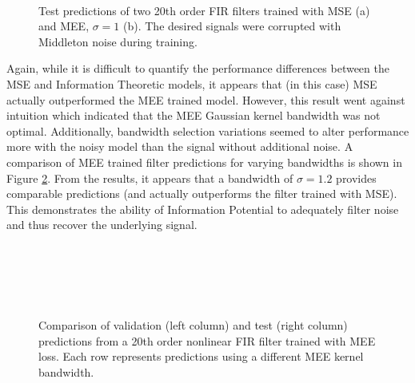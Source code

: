 \documentclass{article}[12 pt]
\begin{document}
\begin{figure}[H]
	\centering
	\quad
	\\
	\caption{Test predictions of two 20th order FIR filters trained with MSE (a) and MEE, $\sigma=1$ (b).  The desired signals were corrupted with Middleton noise during training.}
	\label{fig:test_with_noise}
\end{figure}

Again, while it is difficult to quantify the performance differences between the MSE and Information Theoretic models, it appears that (in this case) MSE actually outperformed the MEE trained model.  However, this result went against intuition which indicated that the MEE Gaussian kernel bandwidth was not optimal. Additionally, bandwidth selection variations seemed to alter performance more with the noisy model than the signal without additional noise. A comparison of  MEE trained filter predictions for varying bandwidths is shown in Figure \ref{fig:mee_bandwidth_comparison}.  From the results, it appears that a bandwidth of $\sigma=1.2$ provides comparable predictions (and actually outperforms the filter trained with MSE).  This demonstrates the ability of Information Potential to adequately filter noise and thus recover the underlying signal.

\begin{figure}[H]
	\centering
	\quad
	\\
	\quad
	\\
	\quad
	\\
	\quad
	\\
	\caption{Comparison of validation (left column) and test (right column) predictions from a 20th order nonlinear FIR filter trained with MEE loss.  Each row represents predictions using a different MEE kernel bandwidth.}
	\label{fig:mee_bandwidth_comparison}
\end{figure}
\end{document}
